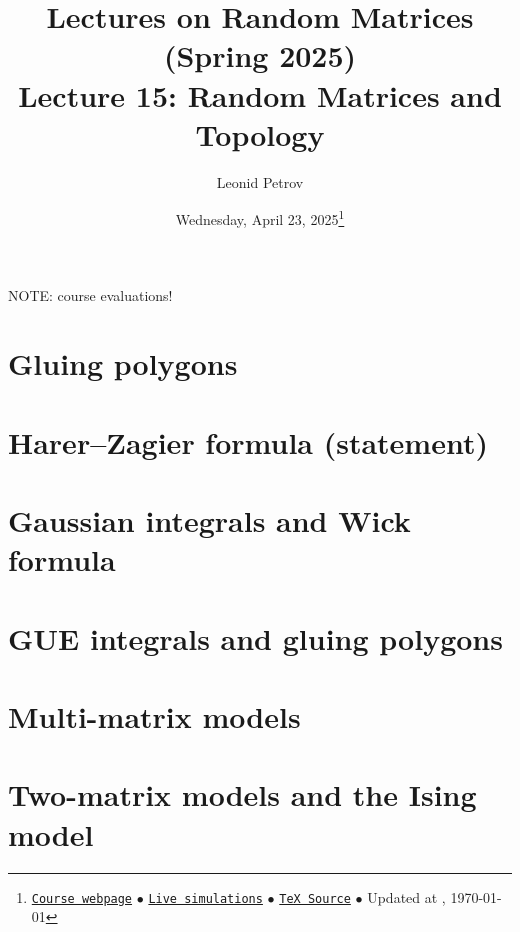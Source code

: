 \documentclass[letterpaper,11pt,oneside,reqno]{article}
\numberwithin{equation}{section}
\theoremstyle{definition}
\begin{document}
\title{Lectures on Random Matrices
(Spring 2025)
\\Lecture 15: Random Matrices and Topology}


\date{Wednesday, April 23, 2025\footnote{\href{https://lpetrov.cc/rmt25/}{\texttt{Course webpage}}
$\bullet$ \href{https://lpetrov.cc/simulations/model/random-matrices/}{\texttt{Live simulations}}
$\bullet$ \href{https://lpetrov.cc/rmt25/rmt25-notes/rmt2025-l15.tex}{\texttt{TeX Source}}
$\bullet$
Updated at \currenttime, \today}}



\author{Leonid Petrov}


\maketitle
\tableofcontents


\huge{NOTE: course evaluations!}


\section{Gluing polygons}








\section{Harer–Zagier formula (statement)}


\section{Gaussian integrals and Wick formula}



\section{GUE integrals and gluing polygons}




\section{Multi-matrix models}



\section{Two-matrix models and the Ising model}
\end{document}
